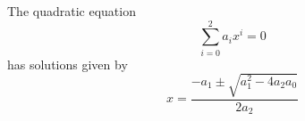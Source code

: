 \documentclass{scrartcl}
\begin{document}
The quadratic equation
\[
    \sum_{i=0}^{2}a_ix^i = 0
\]
has solutions given by
\[
    x = \frac{-a_1 \pm \sqrt{a_1^2 -4a_2a_0}}{2a_2}
\]
\end{document}
